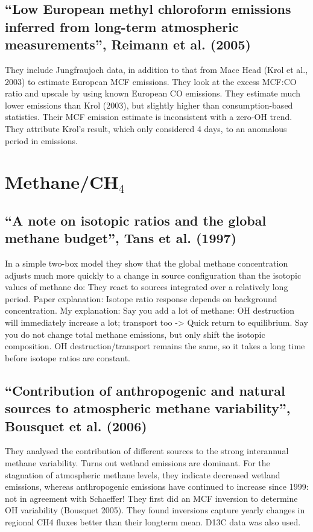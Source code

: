 {\subsection{“Low European methyl chloroform emissions inferred from long-term atmospheric measurements”, Reimann et al. (2005)}
They include Jungfraujoch data, in addition to that from Mace Head (Krol et al., 2003) to estimate European MCF emissions. They look at the excess MCF:CO ratio and upscale by using known European CO emissions. They estimate much lower emissions than Krol (2003), but slightly higher than consumption-based statistics. Their MCF emission estimate is inconsistent with a zero-OH trend.  They attribute Krol’s result, which only considered 4 days, to an anomalous period in emissions.

\section{Methane/CH$_4$}

\subsection{“A note on isotopic ratios and the global methane budget”, Tans et al. (1997)}
In a simple two-box model they show that the global methane concentration adjusts much more quickly to a change in source configuration than the isotopic values of methane do: They react to sources integrated over a relatively long period.
Paper explanation: Isotope ratio response depends on background concentration. My explanation: Say you add a lot of methane: OH destruction will immediately increase a lot; transport too -> Quick return to equilibrium. Say you do not change total methane emissions, but only shift the isotopic composition. OH destruction/transport remains the same, so it takes a long time before isotope ratios are constant.

\subsection{“Contribution of anthropogenic and natural sources to atmospheric methane variability”, Bousquet et al. (2006)}
They analysed the contribution of different sources to the strong interannual methane variability. Turns out wetland emissions are dominant. For the stagnation of atmospheric methane levels, they indicate decreased wetland emissions, whereas anthropogenic emissions have continued to increase since 1999: not in agreement with Schaeffer!
They first did an MCF inversion to determine OH variability (Bousquet 2005). They found inversions capture yearly changes in regional CH4 fluxes better than their longterm mean. D13C data was also used.

}
